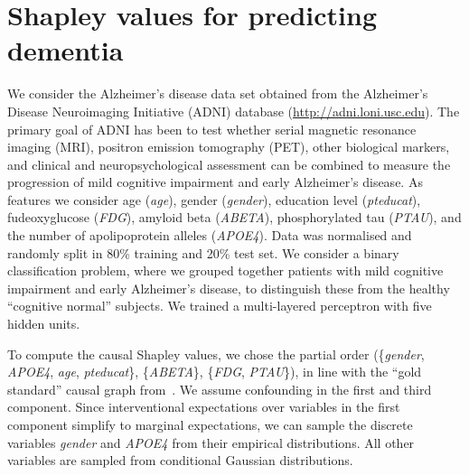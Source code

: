 \documentclass{article}
\begin{document}
\section{Shapley values for predicting dementia}

We consider the Alzheimer's disease data set obtained from the Alzheimer's Disease Neuroimaging Initiative (ADNI) database (\url{http://adni.loni.usc.edu}). The primary goal of ADNI has been to test whether serial magnetic resonance imaging (MRI), positron emission tomography (PET), other biological markers, and clinical and neuropsychological assessment can be combined to measure the progression of mild cognitive impairment and early Alzheimer's disease. As features we consider age ({\em age}), gender ({\em gender}), education level ({\em pteducat}), fudeoxyglucose ({\em FDG}), amyloid beta ({\em ABETA}), phosphorylated
tau ({\em PTAU}), and the number of apolipoprotein alleles ({\em APOE4}). Data was normalised and randomly split in 80\% training and 20\% test set. We consider a binary classification problem, where we grouped together patients with mild cognitive impairment and early Alzheimer's disease, to distinguish these from the healthy ``cognitive normal'' subjects. We trained a multi-layered perceptron with five hidden units.

To compute the causal Shapley values, we chose the partial order (\{{\em gender}, {\em APOE4}, {\em age}, {\em pteducat}\}, \{{\em ABETA}\}, \{{\em FDG}, {\em PTAU}\}), in line with the ``gold standard'' causal graph from~\cite{shen2020challenges}. We assume confounding in the first and third component. Since interventional expectations over variables in the first component simplify to marginal expectations, we can sample the discrete variables {\em gender} and {\em APOE4} from their empirical distributions. All other variables are sampled from conditional Gaussian distributions.
\end{document}
